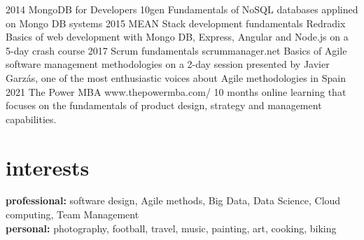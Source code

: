 \documentclass[]{friggeri-cv}
\begin{document}
\begin{entrylist}
\entry
{2014}
{MongoDB for Developers}
{10gen}
{Fundamentals of NoSQL databases applined on Mongo DB systems}
\entry
{2015}
{MEAN Stack development fundamentals}
{Redradix}
{Basics of web development with Mongo DB, Express, Angular and Node.js on a 5-day crash course}
\entry
{2017}
{Scrum fundamentals}
{scrummanager.net}
{Basics of Agile software management methodologies on a 2-day session presented by Javier Garzás, one of the most enthusiastic voices about Agile methodologies in Spain}
\entry
{2021}
{The Power MBA}
{www.thepowermba.com/}
{10 months online learning that focuses on the fundamentals of product design, strategy and management capabilities.}
\end{entrylist}


\section{interests}

\textbf{\headingfont professional:} software design, Agile methods, Big Data, Data Science, Cloud computing, Team Management \\ 
\textbf{\headingfont personal:} photography, football, travel, music, painting, art, cooking, biking



\end{document}
